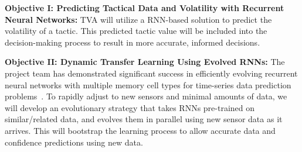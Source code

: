 \documentclass[12pt]{article}
\newcommand{\eg}{\emph{e.g.,}\xspace}
\newcommand{\etc}{etc.\xspace}
\begin{document}



\vspace{1mm} \noindent \textbf{Objective I: Predicting Tactical Data and Volatility with Recurrent Neural Networks: }TVA will utilize a RNN-based solution to predict the volatility of a tactic. This predicted tactic value will be included into the decision-making process to result in more accurate, informed decisions.

\vspace{1mm} \noindent \textbf{Objective II: Dynamic Transfer Learning Using Evolved RNNs:} The project team has demonstrated significant success in efficiently evolving recurrent neural networks with multiple memory cell types for time-series data prediction problems~\cite{desell-exalt-coal-2019,desell-gecco-examm-2019}. To rapidly adjust to new sensors and minimal amounts of data, we will develop an evolutionary strategy that takes RNNs pre-trained on similar/related data, and evolves them in parallel using new sensor data as it arrives. This will bootstrap the learning process to allow accurate data and confidence predictions using new data.
\end{document}
